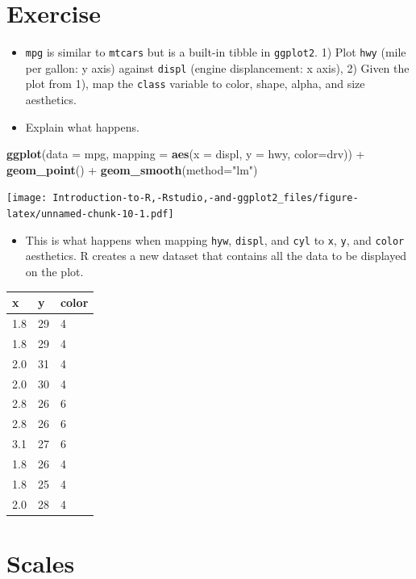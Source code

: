 \documentclass[]{book}
\newenvironment{Shaded}{\begin{snugshade}}{\end{snugshade}}
\newcommand{\KeywordTok}[1]{\textcolor[rgb]{0.13,0.29,0.53}{\textbf{{#1}}}}
\newcommand{\DataTypeTok}[1]{\textcolor[rgb]{0.13,0.29,0.53}{{#1}}}
\newcommand{\StringTok}[1]{\textcolor[rgb]{0.31,0.60,0.02}{{#1}}}
\newcommand{\NormalTok}[1]{{#1}}
\providecommand{\tightlist}{%
  \setlength{\itemsep}{0pt}\setlength{\parskip}{0pt}}
\begin{document}
\section{Exercise}\label{exercise-1}

\begin{itemize}
\item
  \texttt{mpg} is similar to \texttt{mtcars} but is a built-in tibble in
  \texttt{ggplot2}. 1) Plot \texttt{hwy} (mile per gallon: y axis)
  against \texttt{displ} (engine displancement: x axis), 2) Given the
  plot from 1), map the \texttt{class} variable to color, shape, alpha,
  and size aesthetics.
\item
  Explain what happens.
\end{itemize}

\begin{Shaded}
\begin{Highlighting}[]
\KeywordTok{ggplot}\NormalTok{(}\DataTypeTok{data =} \NormalTok{mpg, }\DataTypeTok{mapping =} \KeywordTok{aes}\NormalTok{(}\DataTypeTok{x =} \NormalTok{displ, }\DataTypeTok{y =} \NormalTok{hwy, }\DataTypeTok{color=}\NormalTok{drv)) +}\StringTok{ }\KeywordTok{geom_point}\NormalTok{() +}\StringTok{ }\KeywordTok{geom_smooth}\NormalTok{(}\DataTypeTok{method=}\StringTok{"lm"}\NormalTok{)}
\end{Highlighting}
\end{Shaded}

\texttt{[image: Introduction-to-R,-Rstudio,-and-ggplot2\_files/figure-latex/unnamed-chunk-10-1.pdf]}

\begin{itemize}
\tightlist
\item
  This is what happens when mapping \texttt{hyw}, \texttt{displ}, and
  \texttt{cyl} to \texttt{x}, \texttt{y}, and \texttt{color} aesthetics.
  R creates a new dataset that contains all the data to be displayed on
  the plot.
\end{itemize}

\begin{longtable}[]{@{}lll@{}}
\toprule
x & y & color\tabularnewline
\midrule
\endhead
1.8 & 29 & 4\tabularnewline
1.8 & 29 & 4\tabularnewline
2.0 & 31 & 4\tabularnewline
2.0 & 30 & 4\tabularnewline
2.8 & 26 & 6\tabularnewline
2.8 & 26 & 6\tabularnewline
3.1 & 27 & 6\tabularnewline
1.8 & 26 & 4\tabularnewline
1.8 & 25 & 4\tabularnewline
2.0 & 28 & 4\tabularnewline
\bottomrule
\end{longtable}

\section{Scales}\label{scales}
\end{document}
